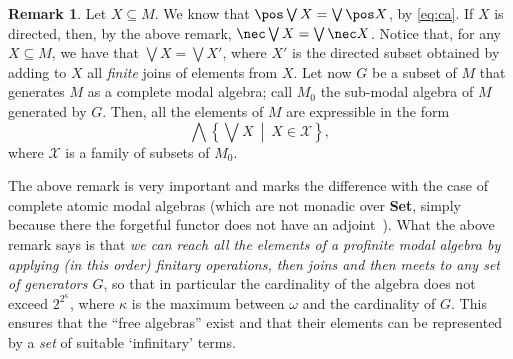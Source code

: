 \documentclass{article}
\theoremstyle{definition}
\newtheorem{rem}{Remark}
\newcommand{\Set}{\textup{\textbf{Set}}}
\begin{document}
\begin{rem}\label{rem:important}
Let $X \subseteq M$. We know that $\pos \bigvee X = \bigvee \pos X$, by \cref{eq:ca}. If $X$ is directed, then, by the above remark, $\nec \bigvee X = \bigvee \nec X$. Notice that, for any $X \subseteq M$, we have that $\bigvee X = \bigvee X'$, where $X'$ is the directed subset obtained by adding to $X$ all \emph{finite} joins of elements from $X$.
Let now $G$ be a subset of $M$ that generates $M$ as a complete modal algebra; call $M_0$ the sub-modal algebra of $M$ generated by $G$. Then, all the elements of $M$ are expressible in the form
$$\bigwedge \left\{ \bigvee X\ \middle\vert\ X \in \mathscr{X}\right\},$$
where $\mathscr{X}$ is a family of subsets of $M_0$.
\end{rem}

The above remark is very important and marks the difference with the case of complete atomic modal algebras (which are not monadic over \Set, simply because there the forgetful functor does not have an adjoint~\cite{MDB-SG}). What the above remark says is that \emph{we can reach all the elements of a profinite modal algebra by applying (in this order) finitary operations, then joins and then meets to any set of generators $G$}, so that in particular the cardinality of the algebra does not exceed $2^{2^{\kappa}}$, where $\kappa$ is the maximum between $\omega$ and the cardinality of $G$. This ensures that the ``free algebras'' exist and that their elements can be represented by a \emph{set} of suitable `infinitary' terms.
\end{document}
